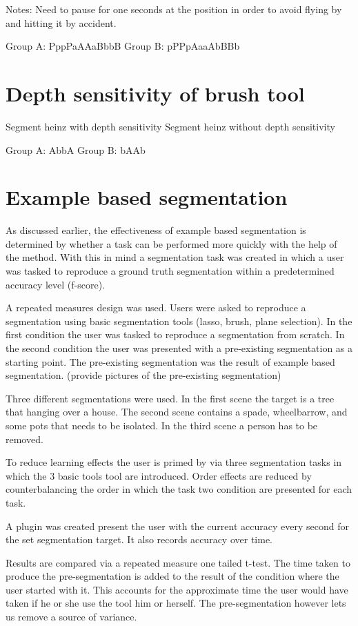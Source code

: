 Notes:
Need to pause for one seconds at the position in order to avoid flying by and hitting it by accident.


Group A: PppPaAAaBbbB
Group B: pPPpAaaAbBBb

\section{Depth sensitivity of brush tool}

Segment heinz with depth sensitivity
Segment heinz without depth sensitivity

Group A: AbbA
Group B: bAAb

\section{Example based segmentation}

As discussed earlier, the effectiveness of example based segmentation is determined by whether a task can be performed more quickly with the help of the method. With this in mind a segmentation task was created in which a user was tasked to reproduce a ground truth segmentation within a predetermined accuracy level (f-score).

A repeated measures design was used. Users were asked to reproduce a segmentation using basic segmentation tools (lasso, brush, plane selection). In the first condition the user was tasked to reproduce a segmentation from scratch. In the second condition the user was presented with a pre-existing segmentation as a starting point. The pre-existing segmentation was the result of example based segmentation. (provide pictures of the pre-existing segmentation)

Three different segmentations were used. In the first scene the target is a tree that hanging over a house. The second scene contains a spade, wheelbarrow, and some pots that needs to be isolated. In the third scene a person has to be removed.

To reduce learning effects the user is primed by via three segmentation tasks in which the 3 basic tools tool are introduced. Order effects are reduced by counterbalancing the order in which the task two condition are presented for each task.

A plugin was created present the user with the current accuracy every second for the set segmentation target. It also records accuracy over time.

Results are compared via a repeated measure one tailed t-test. The time taken to produce the pre-segmentation is added to the result of the condition where the user started with it. This accounts for the approximate time the user would have taken if he or she use the tool him or herself. The pre-segmentation however lets us remove a source of variance.

